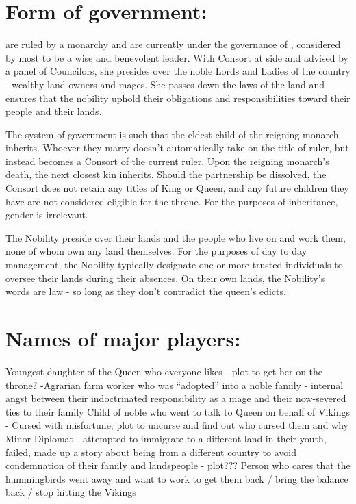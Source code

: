 \documentclass[blue]{GL2020}
\begin{document}
\name{\bAgrarians{}}



\section*{Form of government:}

\pFarm{} are ruled by a monarchy and are currently under the governance of \cQueen{}, considered by most to be a wise and benevolent leader.  With \cQueen{\they} Consort at \cQueen{\their} side and advised by a panel of Councilors, she presides over the noble Lords and Ladies of the country - wealthy land owners and mages.  She passes down the laws of the land and ensures that the nobility uphold their obligations and responsibilities toward their people and their lands.

The system of government is such that the eldest child of the reigning monarch inherits.  Whoever they marry doesn't automatically take on the title of ruler, but instead becomes a Consort of the current ruler.  Upon the reigning monarch's death, the next closest kin inherits.  Should the partnership be dissolved, the Consort does not retain any titles of King or Queen, and any future children they have are not considered eligible for the throne.  For the purposes of inheritance, gender is irrelevant.

The Nobility preside over their lands and the people who live on and work them, none of whom own any land themselves.  For the purposes of day to day management, the Nobility typically designate one or more trusted individuals to oversee their lands during their absences.  On their own lands, the Nobility's words are law - so long as they don't contradict the queen's edicts.


\section*{Names of major players:}

Youngest daughter of the Queen who everyone likes - plot to get her on the throne?
-Agrarian farm worker who was "`adopted"' into a noble family - internal angst between their indoctrinated responsibility as a mage and their now-severed ties to their family
Child of noble who went to talk to Queen on behalf of Vikings - Cursed with misfortune, plot to uncurse and find out who cursed them and why
Minor Diplomat - attempted to immigrate to a different land in their youth, failed, made up a story about being from a different country to avoid condemnation of their family and landspeople - plot???  
Person who cares that the hummingbirds went away and want to work to get them back / bring the balance back / stop hitting the Vikings
\end{document}
